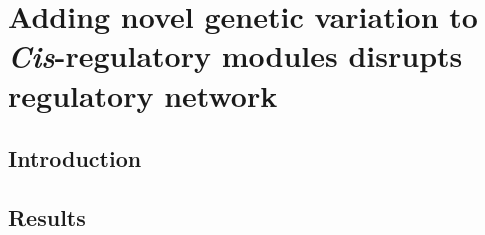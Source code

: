 \documentclass[../main.tex]{subfiles}
\begin{document}
\chapter{Adding novel genetic variation to \textit{Cis}\hyp{}regulatory modules disrupts regulatory network}\label{chapter7}
\section{Introduction}\label{chapter7:introduction}

\section{Results}\label{chapter7:results}
\end{document}
